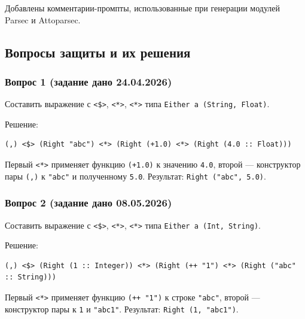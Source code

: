 \documentclass[a4paper, final]{article}
\newenvironment{code}{\captionsetup{type=listing}}{}
\begin{document}
Добавлены комментарии-промпты, использованные при генерации модулей Parsec и
Attoparsec.

\subsection{Вопросы защиты и их решения}

\subsubsection{Вопрос 1 (задание дано 24.04.2026)}

Составить выражение с \texttt{<\$>}, \texttt{<*>}, \texttt{<*>} типа
\texttt{Either a (String, Float)}.

Решение:

\begin{code}
\begin{verbatim}
(,) <$> (Right "abc") <*> (Right (+1.0) <*> (Right (4.0 :: Float)))
\end{verbatim}
\caption*{Листинг 3: Either a (String, Float) через аппликативный функтор}
\end{code}

Первый \texttt{<*>} применяет функцию \texttt{(+1.0)} к значению \texttt{4.0},
второй — конструктор пары \texttt{(,)} к \texttt{"abc"} и полученному
\texttt{5.0}. Результат: \texttt{Right ("abc", 5.0)}.

\subsubsection{Вопрос 2 (задание дано 08.05.2026)}

Составить выражение с \texttt{<\$>}, \texttt{<*>}, \texttt{<*>} типа
\texttt{Either a (Int, String)}.

Решение:

\begin{code}
\begin{verbatim}
(,) <$> (Right (1 :: Integer)) <*> (Right (++ "1") <*> (Right ("abc" :: String)))
\end{verbatim}
\caption*{Листинг 4: Either a (Int, String) через аппликативный функтор}
\end{code}

Первый \texttt{<*>} применяет функцию \texttt{(++ "1")} к строке
\texttt{"abc"}, второй — конструктор пары к \texttt{1} и \texttt{"abc1"}.
Результат: \texttt{Right (1, "abc1")}.
\end{document}
